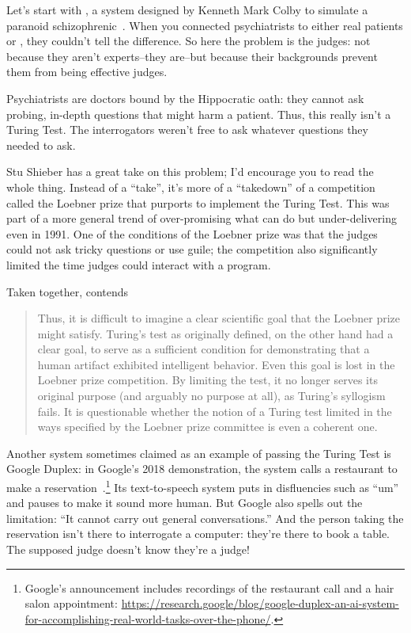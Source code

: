 Let’s start with , a system designed by Kenneth Mark Colby
to simulate a paranoid schizophrenic~\citep{Colby-81}.
%
When you connected psychiatrists to either real patients or ,
they couldn’t tell the difference.
%
So here the problem is the judges: not because they aren’t experts--they
are--but because their backgrounds prevent them from being effective
judges.

Psychiatrists are doctors bound by the Hippocratic oath: they cannot
ask probing, in-depth questions that might harm a patient.
%
Thus, this really isn’t a Turing Test.
%
The interrogators weren't free to ask whatever questions they needed to
ask.

Stu Shieber has a great take on this problem; I’d encourage you to
read the whole thing.
%
Instead of a ``take'', it's more of a ``takedown'' of a competition
called the Loebner prize that purports to implement the Turing Test.
%
This was part of a more general trend of over-promising what 
can do but under-delivering even in 1991.
%
One of the conditions of the Loebner prize was that the judges could not
ask tricky questions or use guile; the competition also significantly
limited the time judges could interact with a program.

Taken together, \citet{shieber-94} contends
\begin{quote}
Thus, it is difficult to imagine a clear scientific goal that the Loebner prize
might satisfy. Turing’s test as originally defined, on the other hand had a
clear goal, to serve as a sufficient condition for demonstrating that a human
artifact exhibited intelligent behavior. Even this goal is lost in the Loebner
prize competition. By limiting the test, it no longer serves its original purpose
(and arguably no purpose at all), as Turing’s syllogism fails. It is questionable
whether the notion of a Turing test limited in the ways specified by the Loebner
prize committee is even a coherent one.
\end{quote}


Another system sometimes claimed as an example of  passing the
Turing Test is Google Duplex: in Google's 2018 demonstration, the system
calls a restaurant to make a reservation~\citep{leviathan-18-duplex}.\footnote{Google's
  announcement includes recordings of the restaurant call and a hair salon
  appointment: \url{https://research.google/blog/google-duplex-an-ai-system-for-accomplishing-real-world-tasks-over-the-phone/}.}
Its text-to-speech system puts in disfluencies such as ``um'' and pauses
to make it sound more human.
%
But Google also spells out the limitation: ``It cannot carry out general
conversations.''
%
And the person taking the reservation isn't there to interrogate a
computer: they're there to book a table.
%
The supposed judge doesn't know they're a judge!

